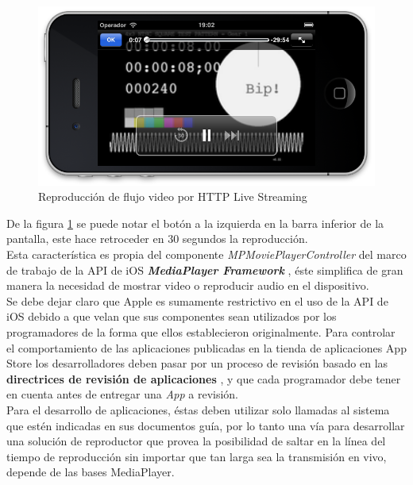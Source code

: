 \begin{figure}[h!]
	\centering
	\includegraphics[scale=0.55]{imgs/sshot_iOS_hls.png}
	\caption{Reproducción de flujo video por HTTP Live Streaming}
	\label{sshot_iOS_hls}	
\end{figure}

De la figura \ref{sshot_iOS_hls} se puede notar el botón a la izquierda en la barra inferior de  la pantalla, este hace retroceder en 30 segundos la reproducción.\\

Esta característica es propia del componente \textit{MPMoviePlayerController} del marco de trabajo de la API de iOS \textit{\textbf{MediaPlayer Framework}} \cite{cap1:mediaplayerframework}, éste simplifica de gran manera la necesidad de mostrar video o reproducir audio en el dispositivo.\\

Se debe dejar claro que Apple es sumamente restrictivo en el uso de la API de iOS debido a que velan que sus componentes sean utilizados por los programadores de la forma que ellos establecieron originalmente. Para controlar el comportamiento de las aplicaciones publicadas en la tienda de aplicaciones App Store los desarrolladores deben pasar por un proceso de revisión basado en las \textbf{directrices de revisión de aplicaciones} \cite{cap1:appstoreguidelines}, y que cada programador debe tener en cuenta antes de entregar una \textit{App} a revisión.\\

Para el desarrollo de aplicaciones, éstas deben utilizar solo llamadas al sistema que estén indicadas en sus documentos guía, por lo tanto una vía para desarrollar una solución de reproductor que provea la posibilidad de saltar en la línea del tiempo de reproducción sin importar que tan larga sea la transmisión en vivo, depende de las bases MediaPlayer. \\

